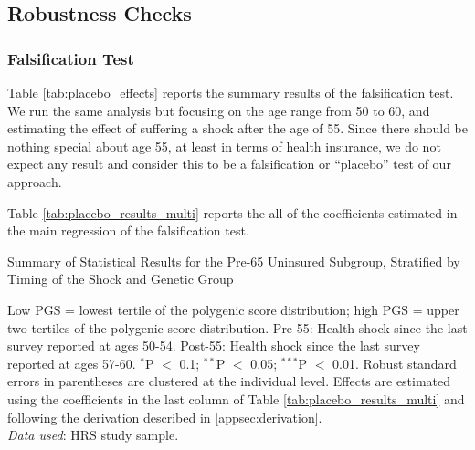 \subsection{Robustness Checks}
\label{supsec:robustness}

\subsubsection{Falsification Test} \label{appsec:placebo}
Table \ref{tab:placebo_effects} reports the summary results of the falsification test. 
We run the same analysis but focusing on the age range from 50 to 60, and estimating the effect of suffering a shock after the age of 55.
Since there should be nothing special about age 55, at least in terms of health insurance, we do not expect any result and consider this to be a falsification or ``placebo'' test of our approach. 


Table \ref{tab:placebo_results_multi} reports the all of the coefficients estimated in the main regression of the falsification test.

\begin{table}[!ht]
	\caption{Summary of Statistical Results for the Pre-65 Uninsured Subgroup, Stratified by Timing of the Shock and Genetic Group}
	\label{tab:placebo_effects}
	
		\begin{flushleft}
			Low PGS = lowest tertile of the polygenic score distribution; high PGS = upper two tertiles of the polygenic score distribution.
			Pre-55: Health shock since the last survey reported at ages 50-54.
			Post-55: Health shock since the last survey reported at ages 57-60.
			$^{*}$P $<$ 0.1; $^{**}$P $<$ 0.05; $^{***}$P $<$ 0.01. Robust standard errors in parentheses are clustered at the individual level.
			Effects are estimated using the coefficients in the last column of Table \ref{tab:placebo_results_multi} and following the derivation described in \ref{appsec:derivation}.\\
			\textit{Data used}: HRS study sample.
		\end{flushleft}
\end{table}


